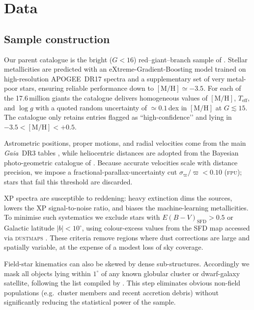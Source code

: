 \documentclass[a4paper,12pt]{article}
\begin{document}
\section{Data}
\label{sec:data}

\subsection{Sample construction}\label{subsec:data_sample}

Our parent catalogue is the bright ($G<16$) red–giant–branch sample of \citet{Andrae2023}.  
Stellar metallicities are predicted with an eXtreme-Gradient-Boosting model trained on high-resolution \textsc{APOGEE}~DR17 spectra and a supplementary set of very metal-poor stars, ensuring reliable performance down to $[\mathrm{M/H}]\simeq-3.5$.  
For each of the 17.6\,million giants the catalogue delivers homogeneous values of $[\mathrm{M/H}]$, $T_{\mathrm{eff}}$, and $\log g$ with a quoted random uncertainty of $\simeq0.1$\,dex in $[\mathrm{M/H}]$ at $G\!\lesssim\!15$.  
The catalogue only retains entries flagged as “high-confidence’’ and lying in $-3.5<[\mathrm{M/H}]<+0.5$.

Astrometric positions, proper motions, and radial velocities come from the main \textit{Gaia}~DR3 tables \citep{GaiaCollaboration2023}, while heliocentric distances are adopted from the Bayesian photo-geometric catalogue of \citet{BailerJones2021}.  
Because accurate velocities scale with distance precision, we impose a fractional-parallax-uncertainty cut $\sigma_{\varpi}/\varpi<0.10$ (\textsc{fpu}); stars that fail this threshold are discarded.

XP spectra are susceptible to reddening: heavy extinction dims the sources, lowers the XP signal-to-noise ratio, and biases the machine-learning metallicities.  
To minimise such systematics we exclude stars with $E(B{-}V)_{\mathrm{SFD}}>0.5$ or Galactic latitude $|b|<10^{\circ}$, using colour-excess values from the SFD map accessed via \textsc{dustmaps} \citep{Green2018}.  
These criteria remove regions where dust corrections are large and spatially variable, at the expense of a modest loss of sky coverage.

Field-star kinematics can also be skewed by dense sub-structures.  
Accordingly we mask all objects lying within $1^{\circ}$ of any known globular cluster or dwarf-galaxy satellite, following the list compiled by \citet{Pace2024}.  
This step eliminates obvious non-field populations (e.g.\ cluster members and recent accretion debris) without significantly reducing the statistical power of the sample.
\end{document}
